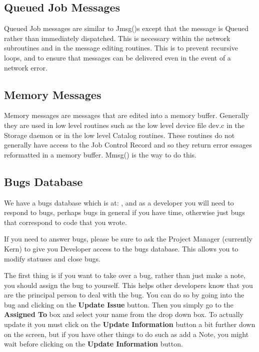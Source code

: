 \subsection{Queued Job Messages}
Queued Job messages are similar to Jmsg()s except that the message is
Queued rather than immediately dispatched. This is necessary within the
network subroutines and in the message editing routines. This is to prevent
recursive loops, and to ensure that messages can be delivered even in the
event of a network error.


\subsection{Memory Messages}

Memory messages are messages that are edited into a memory buffer. Generally
they are used in low level routines such as the low level device file dev.c in
the Storage daemon or in the low level Catalog routines. These routines do not
generally have access to the Job Control Record and so they return error
essages reformatted in a memory buffer. Mmsg() is the way to do this. 

\subsection{Bugs Database}
We have a bugs database which is at:
, and as
a developer you will need to respond to bugs, perhaps bugs in general 
if you have time, otherwise just bugs that correspond to code that
you wrote.

If you need to answer bugs, please be sure to ask the Project Manager
(currently Kern) to give you Developer access to the bugs database. This
allows you to modify statuses and close bugs.

The first thing is if you want to take over a bug, rather than just make a
note, you should assign the bug to yourself. This helps other developers
know that you are the principal person to deal with the bug.  You can do so
by going into the bug and clicking on the {\bf Update Issue} button. Then
you simply go to the {\bf Assigned To} box and select your name from the
drop down box.  To actually update it you must click on the {\bf Update
Information} button a bit further down on the screen, but if you have other
things to do such as add a Note, you might wait before clicking on the {\bf
Update Information} button.

